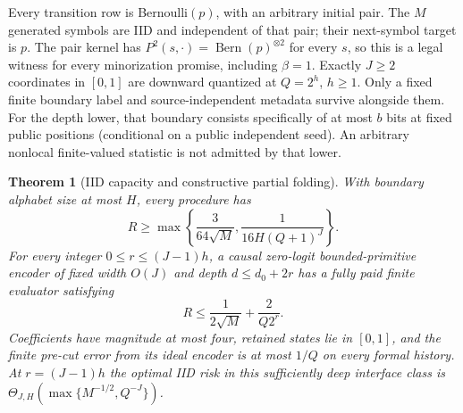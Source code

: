 \documentclass[11pt,letterpaper]{article}
\newtheorem{theorem}{Theorem}[section]
\theoremstyle{definition}\newtheorem{definition}[theorem]{Definition}
\theoremstyle{remark}\newtheorem{remark}[theorem]{Remark}
\begin{document}
Every transition row is Bernoulli$(p)$, with an arbitrary initial pair. The $M$ generated symbols are IID and independent of that pair; their next-symbol target is $p$. The pair kernel has $P^2(s,\cdot)=\operatorname{Bern}(p)^{\otimes2}$ for every $s$, so this is a legal witness for every minorization promise, including $\beta=1$. Exactly $J\ge2$ coordinates in $[0,1]$ are downward quantized at $Q=2^h$, $h\ge1$. Only a fixed finite boundary label and source-independent metadata survive alongside them. For the depth lower, that boundary consists specifically of at most $b$ bits at fixed public positions (conditional on a public independent seed). An arbitrary nonlocal finite-valued statistic is not admitted by that lower.

\begin{theorem}[IID capacity and constructive partial folding]\label{thm:iidcapacity}
With boundary alphabet size at most $H$, every procedure has
\[
 R\ge\max\left\{\frac3{64\sqrt M},\frac1{16H(Q+1)^J}\right\}.
\]
For every integer $0\le r\le(J-1)h$, a causal zero-logit bounded-primitive encoder of fixed width $O(J)$ and depth $d\le d_0+2r$ has a fully paid finite evaluator satisfying
\[
 R\le\frac1{2\sqrt M}+\frac2{Q2^r}.
\]
Coefficients have magnitude at most four, retained states lie in $[0,1]$, and the finite pre-cut error from its ideal encoder is at most $1/Q$ on every formal history. At $r=(J-1)h$ the optimal IID risk in this sufficiently deep interface class is
$\Theta_{J,H}(\max\{M^{-1/2},Q^{-J}\})$.
\end{theorem}
\end{document}
